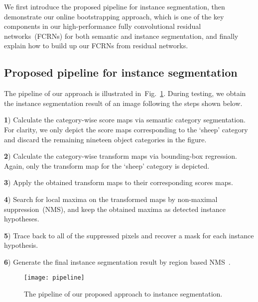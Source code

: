 \documentclass{article}
\begin{document}
We first introduce the proposed pipeline for instance segmentation,
then demonstrate our online bootstrapping approach,
which is one of the key components in our high-performance fully convolutional residual networks~(FCRNs) for both semantic and instance segmentation,
and finally explain how to build up our FCRNs from residual networks.




\subsection{Proposed pipeline for instance segmentation}


The pipeline of our approach is illustrated in~Fig.~\ref{fig:pipeline}.
During testing, we obtain the instance segmentation result of an image following the steps shown below.


{\bf 1}) Calculate the category-wise score maps via semantic category segmentation.
For clarity, we only depict the score maps corresponding to the `sheep' category and discard the remaining nineteen object categories in the figure.
\vspace{-1.5mm}

{\bf 2}) Calculate the category-wise transform maps via bounding-box regression.
Again, only the transform map for the `sheep' category is depicted.
\vspace{-1.5mm}

{\bf 3}) Apply the obtained transform maps to their corresponding scores maps.
\vspace{-1.5mm}

{\bf 4}) Search for local maxima on the transformed maps by non-maximal suppression~(NMS),
and keep the obtained maxima as detected instance hypotheses.
\vspace{-1.5mm}

{\bf 5}) Trace back to all of the suppressed pixels and recover a mask for each instance hypothesis.
\vspace{-1.5mm}

{\bf 6}) Generate the final instance segmentation result by region based NMS~\cite{SDS.ECCV.2014.Hariharan}.



\begin{figure}[t!]
\centering
\texttt{[image: pipeline]}
\caption{The pipeline of our proposed approach to instance segmentation.}
\label{fig:pipeline}
\end{figure}
\end{document}
